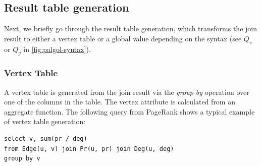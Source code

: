\documentclass{sokendai_thesis} %
\begin{document}

\subsection{Result table generation}

Next, we briefly go through the result table generation, which transforms the join result to either a vertex table or a global value depending on the syntax (see $Q_v$ or $Q_g$ in \autoref{fig:palgol-syntax}).

\subsubsection{Vertex Table}
\label{sec:vertex-table-gen}

A vertex table is generated from the join result via the \textit{group by} operation over one of the columns in the table.
The vertex attribute is calculated from an aggregate function.
The following query from PageRank shows a typical example of vertex table generation:
\begin{lstlisting}[language=sql-graph]
select v, sum(pr / deg)
from Edge(u, v) join Pr(u, pr) join Deg(u, deg)
group by v
\end{lstlisting}
\end{document}
